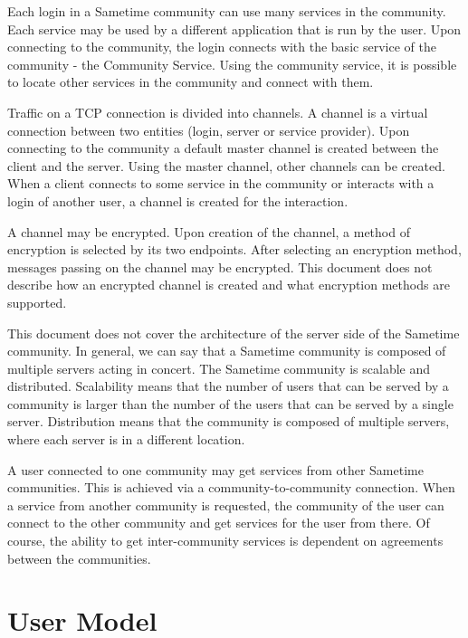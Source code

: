 \documentclass[titlepage,oneside]{book}
\begin{document}
\par{} Each login in a Sametime community can use many services in the
community. Each service may be used by a different application that is
run by the user. Upon connecting to the community, the login connects
with the basic service of the community - the Community Service. Using
the community service, it is possible to locate other services in the
community and connect with them.

\par{} Traffic on a TCP connection is divided into channels. A channel
is a virtual connection between two entities (login, server or service
provider). Upon connecting to the community a default master channel
is created between the client and the server. Using the master
channel, other channels can be created. When a client connects to some
service in the community or interacts with a login of another user, a
channel is created for the interaction.

\par{} A channel may be encrypted. Upon creation of the channel, a
method of encryption is selected by its two endpoints. After selecting
an encryption method, messages passing on the channel may be
encrypted.  This document does not describe how an encrypted channel
is created and what encryption methods are supported.

\par{} This document does not cover the architecture of the server
side of the Sametime community. In general, we can say that a Sametime
community is composed of multiple servers acting in concert. The
Sametime community is scalable and distributed. Scalability means that
the number of users that can be served by a community is larger than
the number of the users that can be served by a single server.
Distribution means that the community is composed of multiple servers,
where each server is in a different location.

\par{} A user connected to one community may get services from other
Sametime communities. This is achieved via a community-to-community
connection.  When a service from another community is requested, the
community of the user can connect to the other community and get
services for the user from there. Of course, the ability to get
inter-community services is dependent on agreements between the
communities.

\chapter{User Model}
\end{document}

